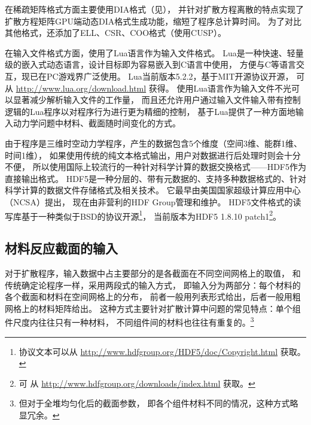 在稀疏矩阵格式方面主要使用DIA格式（见），
并针对扩散方程离散的特点实现了扩散方程矩阵GPU端动态DIA格式生成功能，缩短了程序总计算时间。
为了对比其他格式，还添加了ELL、CSR、COO格式（使用CUSP）。

在输入文件格式方面，\ProgramName 使用了Lua语言作为输入文件格式。
Lua是一种快速、轻量级的嵌入式动态语言，设计目标即为容易嵌入到C语言中使用，
方便与C等语言交互，现已在PC游戏界广泛使用。
Lua当前版本5.2.2，基于MIT开源协议开源，
可从 \url{http://www.lua.org/download.html} 获得。
使用Lua语言作为输入文件不光可以显著减少解析输入文件的工作量，
而且还允许用户通过输入文件输入带有控制逻辑的Lua程序以对程序行为进行更为精细的控制，
\ProgramName 基于Lua提供了一种方面地输入动力学问题中材料、截面随时间变化的方式。

由于\ProgramName 程序是三维时空动力学程序，产生的数据包含5个维度（空间3维、能群1维、时间1维），
如果使用传统的纯文本格式输出，用户对数据进行后处理时则会十分不便，
所以\ProgramName 使用国际上较流行的一种针对科学计算的数据交换格式——HDF5作为直接输出格式。
HDF5是一种分层的、带有元数据的、支持多种数据格式的、针对科学计算的数据文件存储格式及相关技术。
它最早由美国国家超级计算应用中心（NCSA）提出，
现在由非营利的HDF Group管理和维护。
HDF5文件格式的读写库基于一种类似于BSD的协议开源\footnote{协议文本可以从
\url{http://www.hdfgroup.org/HDF5/doc/Copyright.html} 获取。}，
当前版本为HDF5 1.8.10 patch1\footnote{可
从 \url{http://www.hdfgroup.org/downloads/index.html} 获取。}。

\begin{comment}

由于\ProgramName 程序使用人不能直接读取的HDF5格式进行输出，所以需要额外的工具进行数据后处理。
支持HDF5格式的第三方工具和编程语言比较丰富，本文则推荐Python语言作为后处理语言，
并提供一些Python程序作为示例。
Python语言是一种面向对象的动态语言，现在在学术界和工业界都十分流行，
不少GPU加速工具和科学可视化工具都使用Python编写，
所以本文也使用Python作为主要数据前处理、
后处理脚本语言。\footnote{Python可以从
\url{http://www.Python.org} 免费获取，本文使用 Python2.7.x 的语法。}

\end{comment}

\subsection{材料反应截面的输入}

对于扩散程序，输入数据中占主要部分的是各截面在不同空间网格上的取值，
\ProgramName 和传统确定论程序一样，采用两段式的输入方式，
即输入分为两部分：每个材料的各个截面和材料在空间网格上的分布，
前者一般用列表形式给出，后者一般用粗网格上的材料矩阵给出。
这种方式主要针对扩散计算中问题的常见特点：单个组件尺度内往往只有一种材料，
不同组件间的材料也往往有重复的。\footnote{但对于全堆均匀化后的截面参数，
即各个组件材料不同的情况，这种方式略显冗余。}

